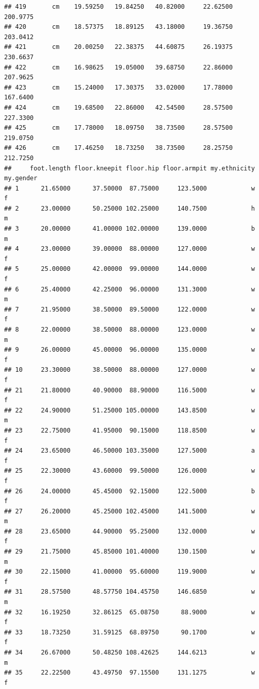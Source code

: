 \documentclass[]{article}
\begin{document}
\begin{verbatim}
## 419       cm    19.59250   19.84250   40.82000     22.62500  200.9775
## 420       cm    18.57375   18.89125   43.18000     19.36750  203.0412
## 421       cm    20.00250   22.38375   44.60875     26.19375  230.6637
## 422       cm    16.98625   19.05000   39.68750     22.86000  207.9625
## 423       cm    15.24000   17.30375   33.02000     17.78000  167.6400
## 424       cm    19.68500   22.86000   42.54500     28.57500  227.3300
## 425       cm    17.78000   18.09750   38.73500     28.57500  219.0750
## 426       cm    17.46250   18.73250   38.73500     28.25750  212.7250
##     foot.length floor.kneepit floor.hip floor.armpit my.ethnicity my.gender
## 1      21.65000      37.50000  87.75000     123.5000            w         f
## 2      23.00000      50.25000 102.25000     140.7500            h         m
## 3      20.00000      41.00000 102.00000     139.0000            b         m
## 4      23.00000      39.00000  88.00000     127.0000            w         f
## 5      25.00000      42.00000  99.00000     144.0000            w         f
## 6      25.40000      42.25000  96.00000     131.3000            w         m
## 7      21.95000      38.50000  89.50000     122.0000            w         f
## 8      22.00000      38.50000  88.00000     123.0000            w         m
## 9      26.00000      45.00000  96.00000     135.0000            w         f
## 10     23.30000      38.50000  88.00000     127.0000            w         f
## 21     21.80000      40.90000  88.90000     116.5000            w         f
## 22     24.90000      51.25000 105.00000     143.8500            w         m
## 23     22.75000      41.95000  90.15000     118.8500            w         f
## 24     23.65000      46.50000 103.35000     127.5000            a         f
## 25     22.30000      43.60000  99.50000     126.0000            w         f
## 26     24.00000      45.45000  92.15000     122.5000            b         f
## 27     26.20000      45.25000 102.45000     141.5000            w         m
## 28     23.65000      44.90000  95.25000     132.0000            w         f
## 29     21.75000      45.85000 101.40000     130.1500            w         m
## 30     22.15000      41.00000  95.60000     119.9000            w         f
## 31     28.57500      48.57750 104.45750     146.6850            w         m
## 32     16.19250      32.86125  65.08750      88.9000            w         f
## 33     18.73250      31.59125  68.89750      90.1700            w         f
## 34     26.67000      50.48250 108.42625     144.6213            w         m
## 35     22.22500      43.49750  97.15500     131.1275            w         f

\end{verbatim}
\end{document}
